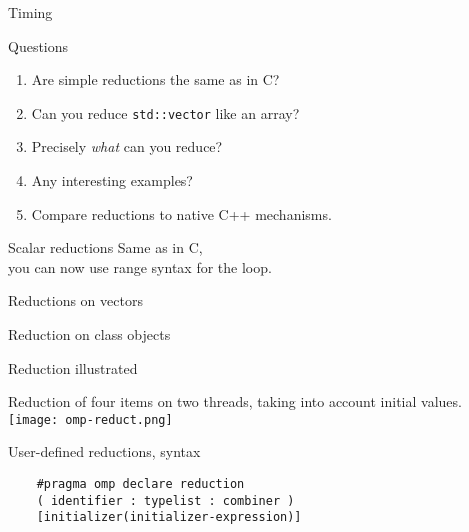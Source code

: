 \documentclass[10pt]{beamer}
\begin{document}
\begin{numberedframe}{Timing}
  
\end{numberedframe}


\begin{numberedframe}{Questions}
  \begin{enumerate}
  \item Are simple reductions the same as in C?
  \item Can you reduce \lstinline{std::vector} like an array?
  \item Precisely \emph{what} can you reduce?
  \item Any interesting examples?
  \item Compare reductions to native C++ mechanisms.
  \end{enumerate}
\end{numberedframe}

\begin{numberedframe}{Scalar reductions}
  Same as in C,\\
  you can now use range syntax for the loop.
\end{numberedframe}

\begin{numberedframe}{Reductions on vectors}
  
\end{numberedframe}

\begin{numberedframe}{Reduction on class objects}
  
\end{numberedframe}

\begin{numberedframe}{Reduction illustrated}
  \label{fig:omp-reduct}

  Reduction of four items on two threads, taking into account
  initial values.
  \texttt{[image: omp-reduct.png]}
\end{numberedframe}

\begin{numberedframe}{User-defined reductions, syntax}
  \begin{lstlisting}
    #pragma omp declare reduction 
    ( identifier : typelist : combiner )
    [initializer(initializer-expression)]
  \end{lstlisting}
\end{numberedframe}
\end{document}
